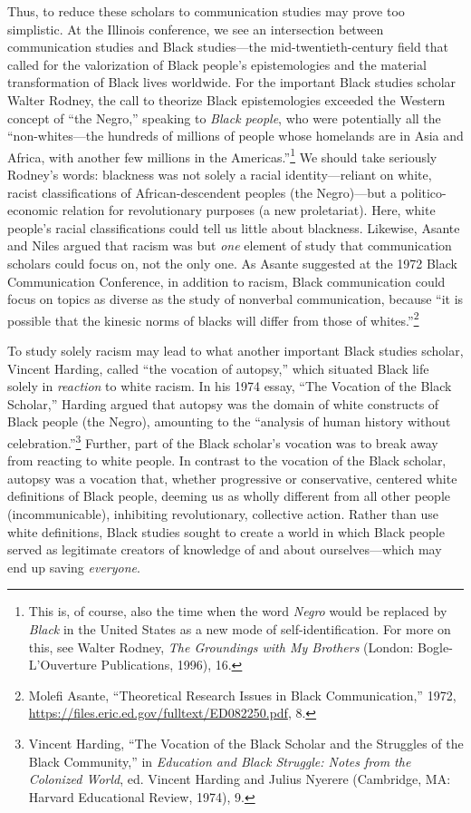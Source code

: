 \documentclass{tufte-handout}
\begin{document}
Thus, to reduce these scholars to communication studies may prove too
simplistic. At the Illinois conference, we see an intersection between
communication studies and Black studies---the mid-twentieth-century
field that called for the valorization of Black people's epistemologies
and the material transformation of Black lives worldwide. For the
important Black studies scholar Walter Rodney, the call to theorize
Black epistemologies exceeded the Western concept of ``the Negro,''
speaking to \emph{Black people}, who were potentially all the
``non-whites---the hundreds of millions of people whose homelands are in
Asia and Africa, with another few millions in the
Americas.''\footnote{This is, of course, also the time when the word \emph{Negro} would be
  replaced by \emph{Black} in the United States as a new mode of
  self-identification. For more on this, see Walter Rodney, \emph{The
  Groundings with My Brothers} (London: Bogle-L'Ouverture Publications,
  1996), 16.
} We should take
seriously Rodney's words: blackness was not solely a racial
identity---reliant on white, racist classifications of
African-descendent peoples (the Negro)---but a politico-economic
relation for revolutionary purposes (a new proletariat). Here, white
people's racial classifications could tell us little about blackness.
Likewise, Asante and Niles argued that racism was but \emph{one} element
of study that communication scholars could focus on, not the only one.
As Asante suggested at the 1972 Black Communication Conference, in
addition to racism, Black communication could focus on topics as diverse
as the study of nonverbal communication, because ``it is possible that
the kinesic norms of blacks will differ from those of
whites.''\footnote{Molefi Asante, ``Theoretical Research Issues in Black Communication,''
  1972, \url{https://files.eric.ed.gov/fulltext/ED082250.pdf}, 8.
}

To study solely racism may lead to what another important Black studies
scholar, Vincent Harding, called ``the vocation of autopsy,'' which
situated Black life solely in \emph{reaction} to white racism. In his
1974 essay, ``The Vocation of the Black Scholar,'' Harding argued that
autopsy was the domain of white constructs of Black people (the Negro),
amounting to the ``analysis of human history without
celebration.''\footnote{Vincent Harding, ``The Vocation of the Black Scholar and the Struggles
  of the Black Community,'' in \emph{Education and Black Struggle: Notes
  from the Colonized World}, ed. Vincent Harding and Julius Nyerere
  (Cambridge, MA: Harvard Educational Review, 1974), 9.
} Further, part of
the Black scholar's vocation was to break away from reacting to white
people. In contrast to the vocation of the Black scholar, autopsy was a
vocation that, whether progressive or conservative, centered white
definitions of Black people, deeming us as wholly different from all
other people (incommunicable), inhibiting revolutionary, collective
action. Rather than use white definitions, Black studies sought to
create a world in which Black people served as legitimate creators of
knowledge of and about ourselves---which may end up saving
\emph{everyone}.
\end{document}
